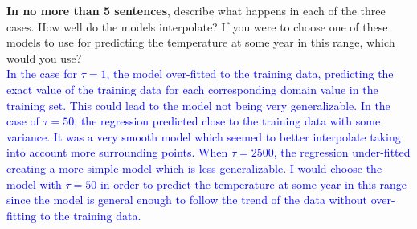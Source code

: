 \documentclass[submit]{harvardml}
\begin{document}
\begin{problem}
\begin{enumerate}
\textbf{In no more than 5 sentences}, describe what happens in each of the three cases. How well do the models interpolate? If you were to choose one of these models to use for predicting the temperature at some year in this range, which would you use? \\
\textcolor{blue}{In the case for $\tau = 1$, the model over-fitted to the training data, predicting the exact value of the training data for each corresponding domain value in the training set. This could lead to the model not being very generalizable. In the case of $\tau = 50$, the regression predicted close to the training data with some variance. It was a very smooth model which seemed to better interpolate taking into account more surrounding points. When $\tau = 2500$, the regression under-fitted creating a more simple model which is less generalizable. I would choose the model with $\tau = 50$ in order to predict the temperature at some year in this range since the model is general enough to follow the trend of the data without over-fitting to the training data. }


\end{enumerate}

\end{problem}
\newpage
\end{document}
